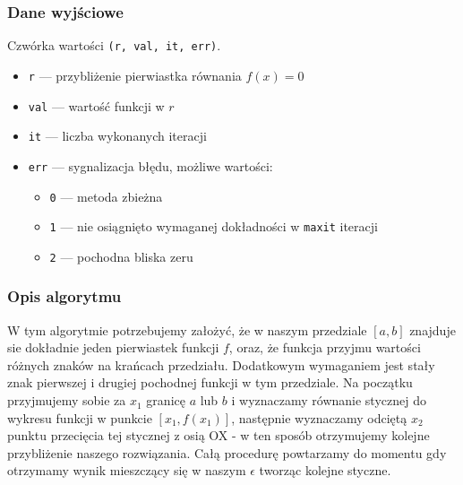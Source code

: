 \documentclass{article}
\begin{document}
\subsubsection*{Dane wyjściowe}
	Czwórka wartości \texttt{(r, val, it, err)}.
	\begin{itemize}
	    \item \texttt{r} — przybliżenie pierwiastka równania $f(x) = 0$
	    \item \texttt{val} — wartość funkcji w $r$
	    \item \texttt{it} — liczba wykonanych iteracji
	    \item \texttt{err} — sygnalizacja błędu, możliwe wartości:
	    \begin{itemize}
	        \item \texttt{0} — metoda zbieżna
	        \item \texttt{1} — nie osiągnięto wymaganej dokładności w \texttt{maxit} iteracji
	        \item \texttt{2} — pochodna bliska zeru
	    \end{itemize}
	\end{itemize}
\subsubsection*{Opis algorytmu}
	W tym algorytmie potrzebujemy założyć, że w naszym przedziale $[a, b]$ znajduje sie dokładnie jeden pierwiastek funkcji $f$, oraz, że funkcja przyjmu wartości różnych znaków na krańcach przedziału. Dodatkowym wymaganiem jest stały znak pierwszej i drugiej pochodnej funkcji w tym przedziale.
	Na początku przyjmujemy sobie za $x_1$ granicę $a$ lub $b$ i wyznaczamy równanie stycznej do wykresu funkcji w punkcie $[x_1, f(x_1)]$, następnie wyznaczamy odciętą $x_2$ punktu przecięcia tej stycznej z osią OX - w ten sposób otrzymujemy kolejne przybliżenie naszego rozwiązania.\tabularnewline
	Całą procedurę powtarzamy do momentu gdy otrzymamy wynik mieszczący się w naszym $\epsilon$ tworząc kolejne styczne.
\end{document}
